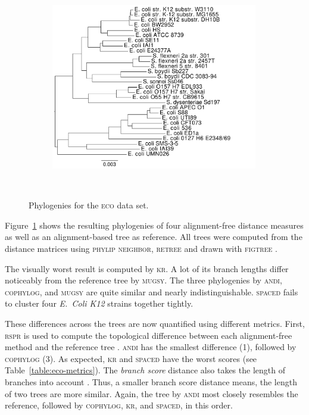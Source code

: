 \documentclass[a4paper,
  10pt,
  english,
  DIV=12,
  BCOR=8mm]{scrbook}
\newcommand{\algo}[1]{\textsc{{#1}}}
\newcommand{\andi}{\algo{andi} }
\newcommand{\eco}{\textsc{eco}\oldstylenums{29}\xspace}
\begin{document}
\begin{figure}
\begin{subfigure}{0.48\textwidth}
    \includegraphics[width=0.99\textwidth]{img/eco29/spaced_labels.pdf}
    \subcaption{\algo{spaced}}
  \end{subfigure} ~
  \caption{\label{fig:eco29}Phylogenies for the \eco data set.}
\end{figure}

Figure~\ref{fig:eco29} shows the resulting phylogenies of four alignment-free distance measures as well as an alignment-based tree as reference. All trees were computed from the distance matrices using \algo{phylip neighbor}, \algo{retree} and drawn with \algo{figtree} \cite{figtree}.

The visually worst result is computed by \algo{kr}. A lot of its branch lengths differ noticeably from the reference tree by \algo{mugsy}. The three phylogenies by \algo{andi}, \algo{cophylog}, and \algo{mugsy} are quite similar and nearly indistinguishable. \algo{spaced} fails to cluster four \emph{E.\ Coli K12} strains together tightly.

These differences across the trees are now quantified using different metrics. First, \algo{rspr} is used to compute the topological difference between each alignment-free method and the reference tree \cite{rspr}. \andi has the smallest difference (1), followed by \algo{cophylog} (3). As expected, \algo{kr} and \algo{spaced} have the worst scores (see Table~\ref{table:eco-metrics}). The \emph{branch score} distance also takes the length of branches into account \cite{branchscore}. Thus, a smaller branch score distance means, the length of two trees are more similar. Again, the tree by \andi most closely resembles the reference, followed by \algo{cophylog}, \algo{kr}, and \algo{spaced}, in this order.
\end{document}
